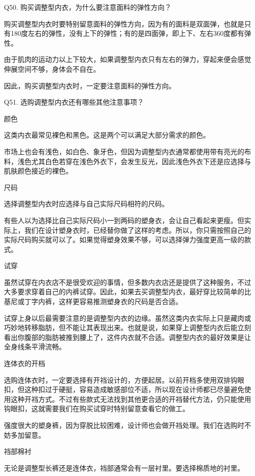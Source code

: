\documentclass[12pt,UTF8]{ctexbook}
\begin{document}
Q50. 购买调整型内衣，为什么要注意面料的弹性方向？


购买调整型内衣时要特别留意面料的弹性方向，因为有的面料是双面弹，也就是只有180度左右的弹性，没有上下的弹性；有的是四面弹，即上下、左右360度都有弹性。

由于肌肉的运动力以上下较大，如果调整型内衣只有左右的弹力，穿起来便会感觉伸展空间不够，身体会不自在。

因此，购买调整型内衣时，一定要注意面料的弹性方向。





Q51. 选购调整型内衣还有哪些其他注意事项？


颜色

这类内衣最常见裸色和黑色。这是两个可以满足大部分需求的颜色。

市场上也会有浅色，如白色、象牙色，但因为调整型内衣通常都使用带有亮光的布料，浅色尤其白色若穿在浅色外衣下，会发生反光，因此浅色外衣下还是应选择与肌肤颜色接近的裸色。

尺码

选择调整型内衣时应选择与自己实际尺码相符的尺码。

有些人以为选择比自己实际尺码小一到两码的塑身衣，会让自己看起来更瘦。但实际上，我们在设计塑身衣时，已经替你做了这样的考虑。所以，你只需按照自己的实际尺码购买就可以了。如果觉得塑身效果不够，可以选择弹力强度更高一级的款式。

试穿

虽然试穿在内衣店不是很受欢迎的事情，但多数内衣店还是提供了这种服务，不过大多要求穿着自己的内裤试穿。因此，如果去买调整型内衣，最好穿比较简单的比基尼或丁字内裤，这样更容易推测塑身衣的尺码是否合适。

试穿上身以后最需要注意的是调整型内衣的边缘。虽然这类内衣实际上只是藏肉或巧妙地转移脂肪，但不能让其表现出来。也就是说，如果穿上调整型内衣后能立刻看出你腹部的脂肪被推到腰上了，这件内衣就不合适。调整型内衣的最好效果是让全身线条平滑流畅。

连体衣的开档

选购连体衣时，一定要选择有开裆设计的，方便起居。以前开档多使用双排钩眼扣，但这种扣过于硬挺，容易造成敏感部位不适，所以现在设计师都已尽量避免使用这种开裆方式。不过有些款式无法找到其他更合适的开裆替代方法，仍只能使用钩眼扣，这就需要我们在购买试穿时特别留意查看它的做工。

强度很大的塑身裤，因为穿脱比较困难，设计师也会做开裆处理。我们在选购时不妨多加留意。

裆部棉衬

无论是调整型长裤还是连体衣，裆部通常会有一层衬里。要选择棉质地的衬里。
\end{document}
